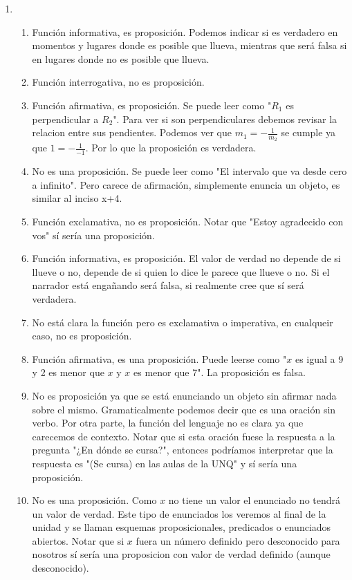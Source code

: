 \documentclass[a4paper]{article}
\newcommand{\exercise}{\item}
\begin{document}
\begin{enumerate}
\begin{enumerate} [label=(\alph*)]
\end{enumerate}\exercise\begin{enumerate} [label=(\alph*)]		\item Función informativa, es proposición. Podemos indicar si es verdadero en momentos y lugares donde es posible que llueva, mientras que será falsa si en lugares donde no es posible que llueva.
		\item Función interrogativa, no es proposición.
		\item Función afirmativa, es proposición. Se puede leer como "$R_1$ es perpendicular a $R_2$". Para ver si son perpendiculares debemos revisar la relacion entre sus pendientes. Podemos ver que $m_1 = -\frac{1}{m_2}$ se cumple ya que $1 = -\frac{1}{-1}$. Por lo que la proposición es verdadera.
		\item No es una proposición. Se puede leer como "El intervalo que va desde cero a infinito". Pero carece de afirmación, simplemente enuncia un objeto, es similar al inciso x+4.
		\item Función exclamativa, no es proposición. Notar que "Estoy agradecido con vos" sí sería una proposición.
		\item Función informativa, es proposición. El valor de verdad no depende de si llueve o no, depende de si quien lo dice le parece que llueve o no. Si el narrador está engañando será falsa, si realmente cree que sí será verdadera.
		\item No está clara la función pero es exclamativa o imperativa, en cualqueir caso, no es proposición.
		\item Función afirmativa, es una proposición. Puede leerse como "$x$ es igual a 9 y 2 es menor que $x$ y $x$ es menor que 7". La proposición es falsa.
		\item No es proposición ya que se está enunciando un objeto sin afirmar nada sobre el mismo. Gramaticalmente podemos decir que es una oración sin verbo. Por otra parte, la función del lenguaje no es clara ya que carecemos de contexto. Notar que si esta oración fuese la respuesta a la pregunta "¿En dónde se cursa?", entonces podríamos interpretar que la respuesta es "(Se cursa) en las aulas de la UNQ" y sí sería una proposición.
		\item No es una proposición. Como $x$ no tiene un valor el enunciado no tendrá un valor de verdad. Este tipo de enunciados los veremos al final de la unidad y se llaman esquemas proposicionales, predicados o enunciados abiertos. Notar que si $x$ fuera un número definido pero desconocido para nosotros sí sería una proposicion con valor de verdad definido (aunque desconocido).

\end{enumerate}
\end{enumerate}
\end{document}
